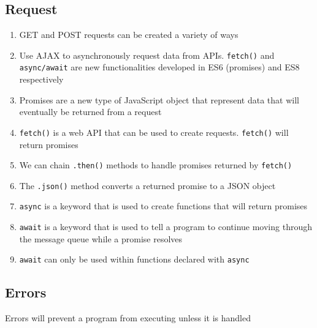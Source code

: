 \documentclass[a4paper, 12pt]{article}
\begin{document}
\subsection{Request}
\begin{enumerate}
\item GET and POST requests can be created a variety of ways
\item Use AJAX to asynchronously request data from APIs. \verb|fetch()| and \verb|async/await| are new functionalities developed in ES6 (promises) and ES8 respectively
\item Promises are a new type of JavaScript object that represent data that will eventually be returned from a request
\item \verb|fetch()| is a web API that can be used to create requests. \verb|fetch()| will return promises
\item We can chain \verb|.then()| methods to handle promises returned by \verb|fetch()|
\item The \verb|.json()| method converts a returned promise to a JSON object
\item \verb|async| is a keyword that is used to create functions that will return promises
\item \verb|await| is a keyword that is used to tell a program to continue moving through the message queue while a promise resolves
\item \verb|await| can only be used within functions declared with \verb|async|
\end{enumerate}

\subsection{Errors}
Errors will prevent a program from executing unless it is handled
\end{document}
